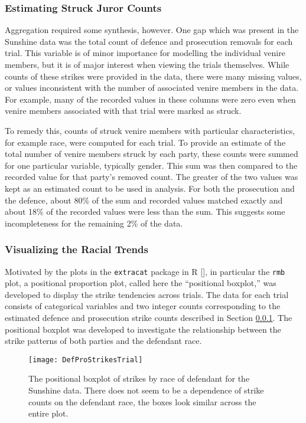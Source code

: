 \subsubsection{Estimating Struck Juror Counts} \label{subsec:struckjur}

Aggregation required some synthesis, however. One gap which was present in the Sunshine data was the total count of defence and prosecution removals for each trial. This
variable is of minor importance for modelling the individual venire
members, but it is of major interest when viewing the trials
themselves. While counts of these strikes were provided in the data, there were many missing values, or values inconsistent with
the number of associated venire members in the data. For example, many of the recorded values in these columns were zero even when
venire members associated with that trial were marked as struck.

To remedy this,  counts of struck venire members with particular characteristics, for example race, were computed for each trial. To
provide an estimate of the total number of venire members struck by each
party, these counts were summed for one particular
variable, typically gender. This sum was then compared to the recorded value for that party's removed count. The greater of the two
values was kept as an estimated count to be used in analysis. For both the prosecution and the defence, about 80\% of the sum and
recorded values matched exactly and about 18\% of the recorded values were less than the sum. This suggests some incompleteness
for the remaining 2\% of the data.

\subsubsection{Visualizing the Racial Trends} \label{subsec:vistrend}

Motivated by the plots in the \texttt{extracat} package in R [\cite{extracat}], in particular the \texttt{rmb} plot, a
positional proportion plot, called here the ``positional boxplot,'' was developed to display the strike tendencies across
trials. The data for each trial consists of categorical variables and two integer counts corresponding to the estimated defence
and prosecution strike counts described in Section \ref{subsec:struckjur}. The positional boxplot was developed to investigate the
relationship between the strike patterns of both parties and the defendant race.

\begin{figure}[h!]
  \centering
  \texttt{[image: DefProStrikesTrial]}
  \caption[Prosecution and Defence Strikes by Trial]{\footnotesize The positional boxplot of strikes by race of defendant for the
    Sunshine data. There does not seem to be a dependence of strike counts on the defendant race, the boxes look similar across
    the entire plot.}
  \label{fig:trialprodef}
\end{figure}

